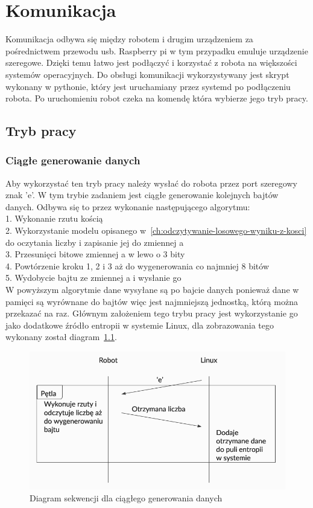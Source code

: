 \chapter{Komunikacja}\label{ch:komunikacja} %

Komunikacja odbywa się między robotem i drugim urządzeniem za pośrednictwem przewodu usb.
Raspberry pi w tym przypadku emuluje urządzenie szeregowe.
Dzięki temu łatwo jest podłączyć i korzystać z robota na większości systemów operacyjnych. 
Do obsługi komunikacji wykorzystywany jest skrypt wykonany w pythonie, który jest uruchamiany 
przez systemd po podłączeniu robota. Po uruchomieniu robot czeka na komendę która wybierze jego tryb pracy. 

\section{Tryb pracy} 

\subsection{Ciągłe generowanie danych}
Aby wykorzystać ten tryb pracy należy wysłać do robota przez port szeregowy znak 'e'.
W tym trybie zadaniem jest ciągłe generowanie kolejnych bajtów danych.
Odbywa się to przez wykonanie następującego algorytmu:\\
1. Wykonanie rzutu kością \\
2. Wykorzystanie modelu opisanego w~\ref{ch:odczytywanie-losowego-wyniku-z-kosci} do oczytania liczby i zapisanie jej do zmiennej a \\
3. Przesunięci bitowe zmiennej a w lewo o 3 bity \\
4. Powtórzenie kroku 1, 2 i 3 aż do wygenerowania co najmniej 8 bitów \\
5. Wydobycie bajtu ze zmiennej a i wysłanie go \\

W powyższym algorytmie dane wysyłane są po bajcie danych ponieważ dane w pamięci 
są wyrównane do bajtów więc jest najmniejszą jednostką, którą można przekazać na raz.
Głównym założeniem tego trybu pracy jest wykorzystanie go jako dodatkowe źródło entropii w systemie Linux, 
dla zobrazowania tego wykonany został diagram~\ref{fig:interface_a}.

\begin{figure}[H]
    \centering
    \includegraphics[width=0.5\linewidth]{chapters/05-Przetwarzanie Wyniku/figures/InterfaceA}
    \caption{Diagram sekwencji dla ciągłego generowania danych}
    \label{fig:interface_a}
\end{figure}

